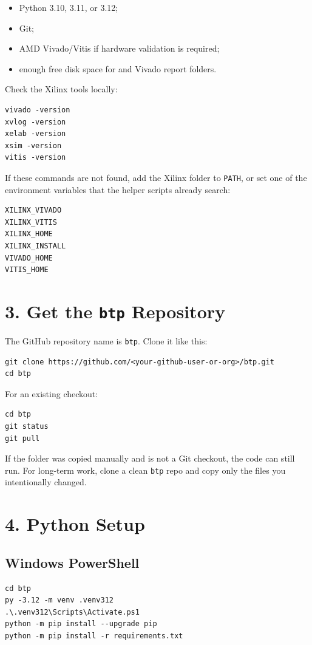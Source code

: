 \documentclass[11pt]{article}
\begin{document}
\begin{itemize}[leftmargin=*]
\item Python 3.10, 3.11, or 3.12;
\item Git;
\item AMD Vivado/Vitis if hardware validation is required;
\item enough free disk space for  and Vivado report folders.
\end{itemize}

Check the Xilinx tools locally:
\begin{lstlisting}[style=cmd]
vivado -version
xvlog -version
xelab -version
xsim -version
vitis -version
\end{lstlisting}

If these commands are not found, add the Xilinx  folder to
\texttt{PATH}, or set one of the environment variables that the helper scripts
already search:
\begin{lstlisting}[style=cmd]
XILINX_VIVADO
XILINX_VITIS
XILINX_HOME
XILINX_INSTALL
VIVADO_HOME
VITIS_HOME
\end{lstlisting}

\section{3. Get the \texttt{btp} Repository}
The GitHub repository name is \texttt{btp}. Clone it like this:
\begin{lstlisting}[style=cmd]
git clone https://github.com/<your-github-user-or-org>/btp.git
cd btp
\end{lstlisting}

For an existing checkout:
\begin{lstlisting}[style=cmd]
cd btp
git status
git pull
\end{lstlisting}

If the folder was copied manually and is not a Git checkout, the code can still
run. For long-term work, clone a clean \texttt{btp} repo and copy only the files
you intentionally changed.

\section{4. Python Setup}
\subsection{Windows PowerShell}
\begin{lstlisting}[style=cmd]
cd btp
py -3.12 -m venv .venv312
.\.venv312\Scripts\Activate.ps1
python -m pip install --upgrade pip
python -m pip install -r requirements.txt
\end{lstlisting}
\end{document}
